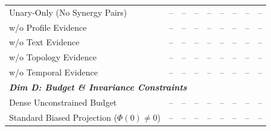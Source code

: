 \begin{table}[t]
{\begin{tabular}{l | cccc | cccc}
\midrule
Unary-Only (No Synergy Pairs) & -- & -- & -- & -- & -- & -- & -- & -- \\
w/o Profile Evidence & -- & -- & -- & -- & -- & -- & -- & -- \\
w/o Text Evidence & -- & -- & -- & -- & -- & -- & -- & -- \\
w/o Topology Evidence & -- & -- & -- & -- & -- & -- & -- & -- \\
w/o Temporal Evidence & -- & -- & -- & -- & -- & -- & -- & -- \\
\midrule
\multicolumn{9}{l}{\textit{\textbf{Dim D: Budget \& Invariance Constraints}}} \\
\midrule
Dense Unconstrained Budget & -- & -- & -- & -- & -- & -- & -- & -- \\
Standard Biased Projection ($\Phi(0) \ne 0$) & -- & -- & -- & -- & -- & -- & -- & -- \\
\bottomrule
\end{tabular}
}
\end{table}